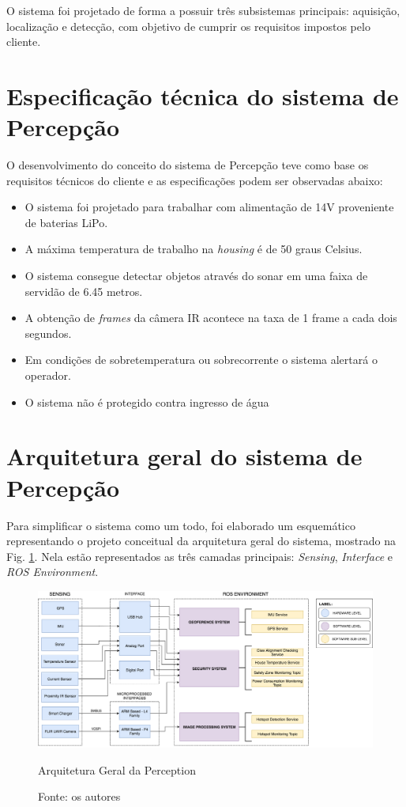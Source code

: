 O sistema foi projetado de forma a possuir três subsistemas principais: aquisição, localização e detecção, com objetivo de cumprir os requisitos impostos pelo cliente.

\section{Especificação técnica do sistema de Percepção}
\label{ssec:espt}

O desenvolvimento do conceito do sistema de Percepção teve como base os requisitos técnicos do cliente e as especificações podem ser observadas abaixo:
\begin{itemize}
\item O sistema foi projetado para trabalhar com alimentação de 14V proveniente de baterias LiPo.
\item A máxima temperatura de trabalho na \textit{housing} é de 50 graus Celsius.
\item O sistema consegue detectar objetos através do sonar em uma faixa de servidão de 6.45 metros.
\item A obtenção de \textit{frames} da câmera IR acontece na taxa de 1 frame a cada dois segundos.
\item Em condições de sobretemperatura ou sobrecorrente o sistema alertará o operador.
\item O sistema não é protegido contra ingresso de água
\end{itemize} 

\section{Arquitetura geral do sistema de Percepção}
\label{ssec:arqg}
Para simplificar o sistema como um todo, foi elaborado um esquemático representando o projeto conceitual da arquitetura geral do sistema, mostrado na Fig. \ref{arqgeral}. Nela estão representados as três camadas principais: \textit{Sensing}, \textit{Interface} e \textit{ROS Environment}.

\begin{figure}[!ht]
\centering
\includegraphics[width=15cm]{Figures/ArquiteturaPerceptionv2.png}
\caption{Arquitetura Geral da Perception}\label{arqgeral}
\caption*{Fonte: os autores}
\end{figure}


